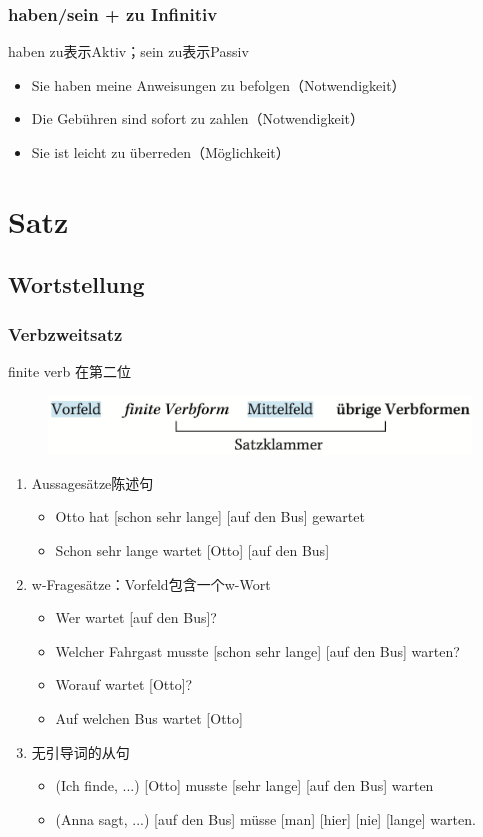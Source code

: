 \documentclass[UTF8]{report}
\begin{document}
\subsection{haben/sein + zu Infinitiv}
haben zu表示Aktiv；sein zu表示Passiv
\begin{itemize}
    \item Sie haben meine Anweisungen zu befolgen（Notwendigkeit）
    \item Die Gebühren sind sofort zu zahlen（Notwendigkeit）
    \item Sie ist leicht zu überreden（Möglichkeit）
\end{itemize}

\chapter{Satz}
\section{Wortstellung}
\subsection{Verbzweitsatz}
finite verb 在第二位
\begin{figure}[H]
    \centering
    \includegraphics[scale=0.5]{w1.png}
\end{figure}
\begin{enumerate}
    \item Aussagesätze陈述句
    \begin{itemize}
        \item Otto hat [schon sehr lange] [auf den Bus] gewartet
        \item Schon sehr lange wartet [Otto] [auf den Bus]
    \end{itemize}
    \item w-Fragesätze：Vorfeld包含一个w-Wort
    \begin{itemize}
        \item Wer wartet [auf den Bus]?
        \item Welcher Fahrgast musste [schon sehr lange] [auf den Bus] warten?
        \item Worauf wartet [Otto]?
        \item Auf welchen Bus wartet [Otto]
    \end{itemize}
    \item 无引导词的从句
    \begin{itemize}
        \item (Ich finde, ...) [Otto] musste [sehr lange] [auf den Bus] warten
        \item (Anna sagt, ...) [auf den Bus] müsse [man] [hier] [nie] [lange] warten.
    \end{itemize}
\end{enumerate}
\end{document}
